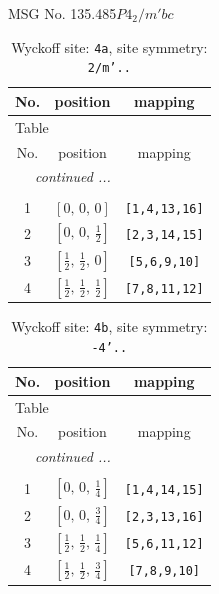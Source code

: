 \documentclass[fleqn,8pt]{jsarticle}
\begin{document}
\setcounter{MaxMatrixCols}{32}

\renewcommand{\tablename}{Table~}
\renewcommand{\figurename}{Figure~}
\begin{center}
\LARGE
MSG No. 135.485\quad$P4_{2}/m'bc$
\end{center}
\renewcommand{\arraystretch}{1.2}
\begin{longtable}{ccc}
\caption{Wyckoff site: {\tt 4a}, site symmetry: {\tt 2/m'..}}
 \\
 \hline \hline
No. & position & mapping \\ \hline \endfirsthead

\multicolumn{2}{l}{\tablename\ \thetable{}} \\
 \hline \hline
No. & position & mapping \\ \hline \endhead

 \hline \hline
\multicolumn{2}{r}{\footnotesize\it continued ...} \\ \endfoot

 \hline \hline
\multicolumn{2}{r}{} \\ \endlastfoot

1 & $\left[ 0,\, 0,\, 0 \right]$ & {\tt [1,4,13,16]} \\ \hline
2 & $\left[ 0,\, 0,\, \frac{1}{2} \right]$ & {\tt [2,3,14,15]} \\ \hline
3 & $\left[ \frac{1}{2},\, \frac{1}{2},\, 0 \right]$ & {\tt [5,6,9,10]} \\ \hline
4 & $\left[ \frac{1}{2},\, \frac{1}{2},\, \frac{1}{2} \right]$ & {\tt [7,8,11,12]} \\
\end{longtable}
\renewcommand{\arraystretch}{1.2}
\begin{longtable}{ccc}
\caption{Wyckoff site: {\tt 4b}, site symmetry: {\tt -4'..}}
 \\
 \hline \hline
No. & position & mapping \\ \hline \endfirsthead

\multicolumn{2}{l}{\tablename\ \thetable{}} \\
 \hline \hline
No. & position & mapping \\ \hline \endhead

 \hline \hline
\multicolumn{2}{r}{\footnotesize\it continued ...} \\ \endfoot

 \hline \hline
\multicolumn{2}{r}{} \\ \endlastfoot

1 & $\left[ 0,\, 0,\, \frac{1}{4} \right]$ & {\tt [1,4,14,15]} \\ \hline
2 & $\left[ 0,\, 0,\, \frac{3}{4} \right]$ & {\tt [2,3,13,16]} \\ \hline
3 & $\left[ \frac{1}{2},\, \frac{1}{2},\, \frac{1}{4} \right]$ & {\tt [5,6,11,12]} \\ \hline
4 & $\left[ \frac{1}{2},\, \frac{1}{2},\, \frac{3}{4} \right]$ & {\tt [7,8,9,10]} \\
\end{longtable}
\end{document}
